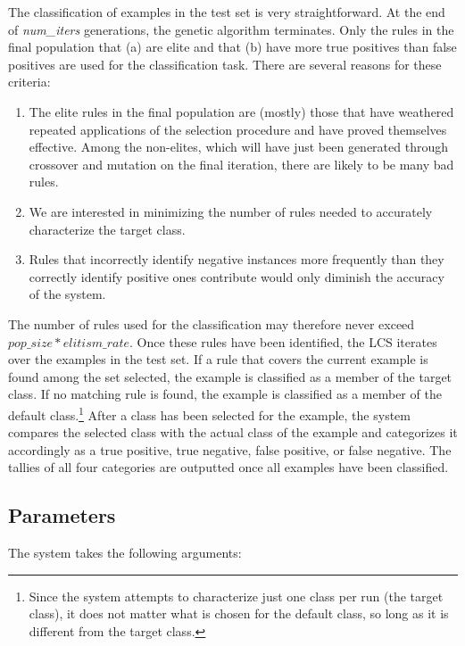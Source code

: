 \documentclass[11pt]{article}
\begin{document}
The classification of examples in the test set is very straightforward. At the end of \textit{num\_iters} generations, the genetic algorithm terminates. Only the rules in the final population that (a) are elite and that (b) have more true positives than false positives are used for the classification task. There are several reasons for these criteria:
\begin{enumerate}
\item The elite rules in the final population are (mostly) those that have weathered repeated applications of the selection procedure and have proved themselves effective. Among the non-elites, which will have just been generated through crossover and mutation on the final iteration, there are likely to be many bad rules.
\item We are interested in minimizing the number of rules needed to accurately characterize the target class.
\item Rules that incorrectly identify negative instances more frequently than they correctly identify positive ones contribute would only diminish the accuracy of the system.
\end{enumerate}

The number of rules used for the classification may therefore never exceed $pop\_size * elitism\_rate$. Once these rules have been identified, the LCS iterates over the examples in the test set. If a rule that covers the current example is found among the set selected, the example is classified as a member of the target class. If no matching rule is found, the example is classified as a member of the default class.\footnote{Since the system attempts to characterize just one class per run (the target class), it does not matter what is chosen for the default class, so long as it is different from the target class.} After a class has been selected for the example, the system compares the selected class with the actual class of the example and categorizes it accordingly as a true positive, true negative, false positive, or false negative. The tallies of all four categories are outputted once all examples have been classified.

\subsection{Parameters}

The system takes the following arguments:
\end{document}
